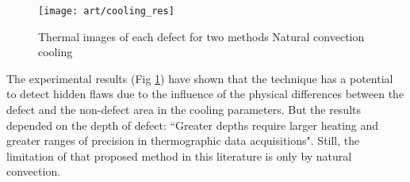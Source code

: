 \begin{figure}
	\hspace{-45pt}
	\texttt{[image: art/cooling\_res]}
	\caption{Thermal images of each defect for two methods Natural convection cooling}
	\label{cooling_res}
\end{figure}

The experimental results (Fig \ref{cooling_res}) have shown that the technique has a potential to detect hidden flaws due to the influence of the physical differences between the defect and the non-defect area in the cooling parameters. But the results depended on the depth of defect: ``Greater depths require larger heating and greater ranges of precision in thermographic data acquisitions". Still, the limitation of that proposed method in this literature is only by natural convection. %

